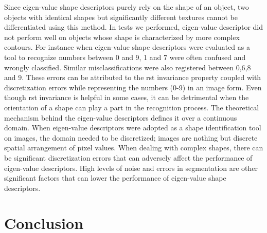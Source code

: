 Since eigen-value shape descriptors purely rely on the shape of an object, two objects with identical shapes but significantly different textures cannot be differentiated using this method. In tests we performed, eigen-value descriptor did not perform well on objects whose shape is characterized by more complex contours. For instance when eigen-value shape descriptors were evaluated as a tool to recognize numbers between 0 and 9, 1 and 7 were often confused and wrongly classified. Similar misclassifications were also registered between 0,6,8 and 9. These errors can be attributed to the \gls{rst} invariance property coupled with discretization errors while representing the numbers (0-9) in an image form. Even though \gls{rst} invariance is helpful in some cases, it can be detrimental when the orientation of a shape can play a part in the recognition process. The theoretical mechanism behind the eigen-value descriptors defines it over a continuous domain. When eigen-value descriptors were adopted as a shape 
identification tool on images, the domain needed to be discretized; images are nothing but discrete spatial arrangement of pixel values. When dealing with complex shapes, there can be significant discretization errors that can adversely affect the performance of eigen-value descriptors. High levels of noise and errors in segmentation are other significant factors that can lower the performance of eigen-value shape descriptors.


\section{Conclusion}

